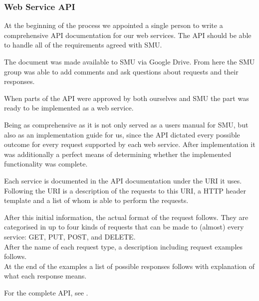 \subsubsection{Web Service API}
At the beginning of the process we appointed a single person to write a comprehensive API documentation for our web services.
The API should be able to handle all of the requirements agreed with SMU.

The document was made available to SMU via Google Drive. From here the SMU group was able to add comments and ask questions about requests and their responses.

When parts of the API were approved by both ourselves and SMU the part was ready to be implemented as a web service.

Being as comprehensive as it is not only served as a users manual for SMU, but also as an implementation guide for us, since the API dictated every possible outcome for every request supported by each web service. After implementation it was additionally a perfect means of determining whether the implemented functionality was complete.

Each service is documented in the API documentation under the URI it uses. Following the URI is a description of the requests to this URI, a HTTP header template and a list of whom is able to perform the requests.

After this initial information, the actual format of the request follows. They are categorised in up to four kinds of requests that can be made to (almost) every service: GET, PUT, POST, and DELETE. \\
After the name of each request type, a description including request examples follows. \\
At the end of the examples a list of possible responses follows with explanation of what each response means.

For the complete API, see .